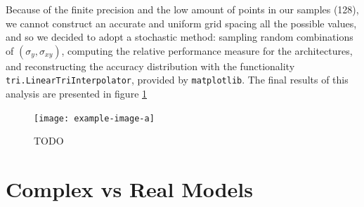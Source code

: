 \documentclass[../main.tex]{subfiles}
\begin{document}
Because of the finite precision and the low amount of points in our samples (128), we cannot construct an accurate and uniform grid spacing all the possible values, and so we decided to adopt a stochastic method: sampling random combinations of $(\sigma_y, \sigma_{xy})$, computing the relative performance measure for the architectures, and reconstructing the accuracy distribution with the functionality \texttt{tri.LinearTriInterpolator}, provided by \texttt{matplotlib}. The final results of this analysis are presented in figure \ref{fig:circ_final}
\begin{figure}[!ht]
	\centering
	\texttt{[image: example-image-a]}
	\caption{TODO}
	\label{fig:circ_final}
\end{figure}




\section{Complex vs Real Models}
	
	
	
\end{document}
